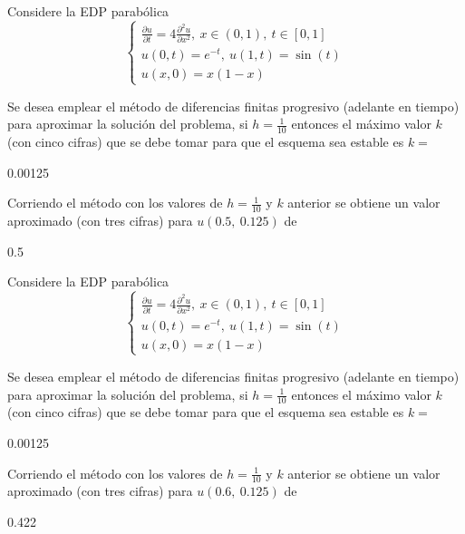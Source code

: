 \documentclass{article}
\begin{document}
\begin{quiz}{}
\begin{cloze}{}
\end{cloze}
    \begin{cloze}{}
	Considere la EDP parab\'olica
	\[\begin{cases}
		\displaystyle\frac{\partial u}{\partial t} = 4\frac{\partial^2 u}{\partial x^2}, \ x\in(0,1), \ t\in[0,1] \\
		u(0,t) = e^{-t}, \ u(1,t)=\sin(t) \\
		u(x,0) = x(1-x)
	\end{cases}\]
	\begin{numerical}[points=15]{}
		Se desea emplear el m\'etodo de diferencias finitas progresivo  (adelante en tiempo) para aproximar la soluci\'on del problema, si $h=\frac{1}{10}$ entonces el m\'aximo valor $k$ (con cinco cifras) que se debe tomar para que el esquema sea estable es $k=$\item 0.00125
	\end{numerical}
	\begin{numerical}[points=18]{}
		Corriendo el m\'etodo con los valores de $h=\frac{1}{10}$ y $k$ anterior se obtiene un valor aproximado (con tres cifras) para $u(0.5,\ 0.125)$ de \item[tolerance=0.003] 0.5
	\end{numerical}
\end{cloze}
    \begin{cloze}{}
	Considere la EDP parab\'olica
	\[\begin{cases}
		\displaystyle\frac{\partial u}{\partial t} = 4\frac{\partial^2 u}{\partial x^2}, \ x\in(0,1), \ t\in[0,1] \\
		u(0,t) = e^{-t}, \ u(1,t)=\sin(t) \\
		u(x,0) = x(1-x)
	\end{cases}\]
	\begin{numerical}[points=15]{}
		Se desea emplear el m\'etodo de diferencias finitas progresivo  (adelante en tiempo) para aproximar la soluci\'on del problema, si $h=\frac{1}{10}$ entonces el m\'aximo valor $k$ (con cinco cifras) que se debe tomar para que el esquema sea estable es $k=$\item 0.00125
	\end{numerical}
	\begin{numerical}[points=18]{}
		Corriendo el m\'etodo con los valores de $h=\frac{1}{10}$ y $k$ anterior se obtiene un valor aproximado (con tres cifras) para $u(0.6,\ 0.125)$ de \item[tolerance=0.003] 0.422
	\end{numerical}
\end{cloze}

\end{quiz}
\end{document}
